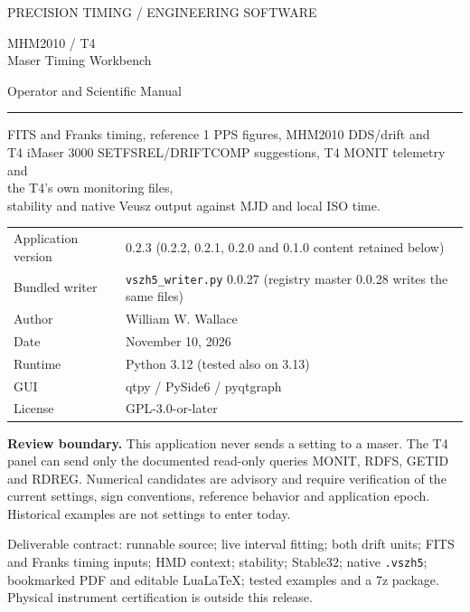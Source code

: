 \documentclass[11pt,a4paper]{article}
\newcommand{\warning}[1]{\par\noindent\colorbox{light}{\parbox{\dimexpr\linewidth-2\fboxsep}{\textbf{Review boundary.} #1}}\par}
\begin{document}
\begin{titlepage}
{\sffamily\color{teal}\large PRECISION TIMING / ENGINEERING SOFTWARE\par}
\vspace{18mm}
{\sffamily\color{navy}\Huge MHM2010 / T4\\Maser Timing Workbench\par}
\vspace{5mm}
{\sffamily\Large Operator and Scientific Manual\par}
\vspace{9mm}
\rule{\linewidth}{1pt}
\vspace{5mm}
{\large FITS and Franks timing, reference 1 PPS figures, MHM2010 DDS/drift and\\
T4 iMaser 3000 SETFSREL/DRIFTCOMP suggestions, T4 MONIT telemetry and\\
the T4's own monitoring files,\\
stability and native Veusz output against MJD and local ISO time.\par}
\vspace{12mm}
\begin{tabular}{@{}ll@{}}
Application version & 0.2.3 (0.2.2, 0.2.1, 0.2.0 and 0.1.0 content retained below)\\
Bundled writer & \texttt{vszh5\_writer.py} 0.0.27 (registry master 0.0.28 writes the same files)\\
Author & William W. Wallace\\
Date & November 10, 2026\\
Runtime & Python 3.12 (tested also on 3.13)\\
GUI & qtpy / PySide6 / pyqtgraph\\
License & GPL-3.0-or-later\\
\end{tabular}
\vfill
\warning{This application never sends a setting to a maser. The T4 panel can
send only the documented read-only queries MONIT, RDFS, GETID and RDREG.
Numerical candidates are advisory and require verification of the current
settings, sign conventions, reference behavior and application epoch.
Historical examples are not settings to enter today.}
\vspace{5mm}
{\small Deliverable contract: runnable source; live interval fitting; both drift
units; FITS and Franks timing inputs; HMD context; stability; Stable32; native
\texttt{.vszh5}; bookmarked PDF and editable LuaLaTeX; tested examples and a 7z package.
Physical instrument certification is outside this release.}
\end{titlepage}
\tableofcontents
\clearpage
\end{document}
